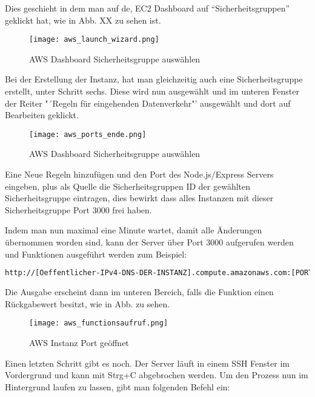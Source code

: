 Dies geschieht in dem man auf de, EC2 Dashboard auf "`Sicherheitsgruppen"' geklickt hat, wie in Abb. XX zu sehen ist. 

\begin{center}
\begin{figure}[h]
    \centering
    \texttt{[image: aws\_launch\_wizard.png]}
    \caption{AWS Dashboard Sicherheitsgruppe auswählen}
\end{figure}
\end{center}

Bei der Erstellung der Instanz, hat man gleichzeitig auch eine Sicherheitsgruppe erstellt, unter Schritt sechs. Diese wird nun ausgewählt und im unteren Fenster der Reiter "´Regeln für eingehenden Datenverkehr"' ausgewählt und dort auf Bearbeiten geklickt.


\begin{center}
\begin{figure}[h]
    \centering
    \texttt{[image: aws\_ports\_ende.png]}
    \caption{AWS Dashboard Sicherheitsgruppe auswählen}
\end{figure}
\end{center}

Eine Neue Regeln hinzufügen und den Port des Node.js/Express Servers eingeben, plus als Quelle die Sicherheitsgruppen ID der gewählten Sicherheitsgruppe eintragen, dies bewirkt dass alles Instanzen mit dieser Sicherheitsgruppe Port 3000 frei haben.

Indem man nun maximal eine Minute wartet, damit alle Änderungen übernommen worden sind, kann der Server über Port 3000 aufgerufen werden und Funktionen ausgeführt werden zum Beispiel:

\begin{lstlisting}[language=bash]
http://[Oeffentlicher-IPv4-DNS-DER-INSTANZ].compute.amazonaws.com:[PORTNUMMER]/[FUNKTIONS_NAME]
\end{lstlisting}

Die Ausgabe erscheint dann im unteren Bereich, falls die Funktion einen Rückgabewert besitzt, wie in Abb. zu sehen.

\begin{center}
\begin{figure}[h]
    \centering
    \texttt{[image: aws\_functionsaufruf.png]}
    \caption{AWS Instanz Port geöffnet}
\end{figure}
\end{center}

Einen letzten Schritt gibt es noch. Der Server läuft in einem SSH Fenster im Vordergrund und kann mit Strg+C abgebrochen werden. Um den Prozess nun im Hintergrund laufen zu lassen, gibt man folgenden Befehl ein:

